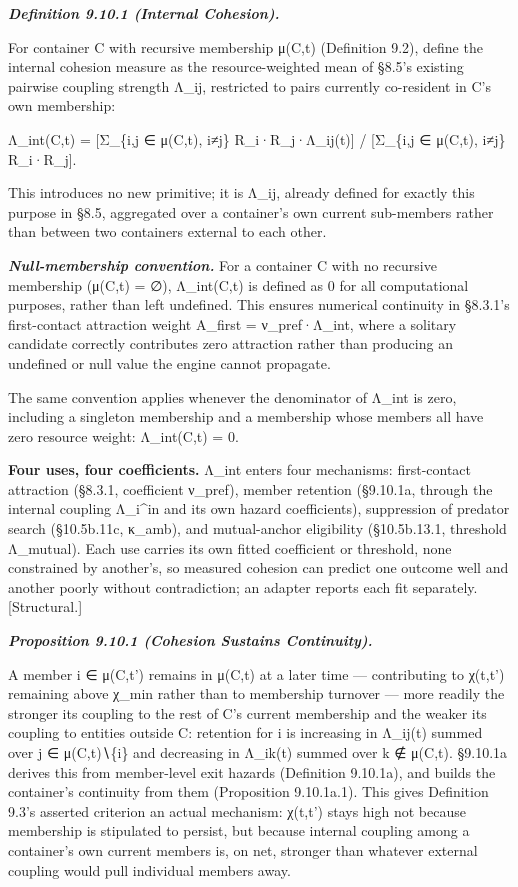 \documentclass[
]{article}
\begin{document}
\emph{\textbf{Definition 9.10.1 (Internal Cohesion).}}

For container C with recursive membership μ(C,t) (Definition 9.2),
define the internal cohesion measure as the resource-weighted mean of
§8.5's existing pairwise coupling strength Λ\_ij, restricted to pairs
currently co-resident in C's own membership:

Λ\_int(C,t) = {[}Σ\_\{i,j ∈ μ(C,t), i≠j\} R\_i·R\_j·Λ\_ij(t){]} /
{[}Σ\_\{i,j ∈ μ(C,t), i≠j\} R\_i·R\_j{]}.

This introduces no new primitive; it is Λ\_ij, already defined for
exactly this purpose in §8.5, aggregated over a container's own current
sub-members rather than between two containers external to each other.

\emph{\textbf{Null-membership convention.}} For a container C with no
recursive membership (μ(C,t) = ∅), Λ\_int(C,t) is defined as 0 for all
computational purposes, rather than left undefined. This ensures
numerical continuity in §8.3.1's first-contact attraction weight
A\_first = ν\_pref·Λ\_int, where a solitary candidate correctly
contributes zero attraction rather than producing an undefined or null
value the engine cannot propagate.

The same convention applies whenever the denominator of Λ\_int is zero,
including a singleton membership and a membership whose members all have
zero resource weight: Λ\_int(C,t) = 0.

\textbf{Four uses, four coefficients.} Λ\_int enters four mechanisms:
first-contact attraction (§8.3.1, coefficient ν\_pref), member retention
(§9.10.1a, through the internal coupling Λ\_i\^{}in and its own hazard
coefficients), suppression of predator search (§10.5b.11c, κ\_amb), and
mutual-anchor eligibility (§10.5b.13.1, threshold Λ\_mutual). Each use
carries its own fitted coefficient or threshold, none constrained by
another's, so measured cohesion can predict one outcome well and another
poorly without contradiction; an adapter reports each fit separately.
{[}Structural.{]}

\emph{\textbf{Proposition 9.10.1 (Cohesion Sustains Continuity).}}

A member i ∈ μ(C,t') remains in μ(C,t) at a later time --- contributing
to χ(t,t') remaining above χ\_min rather than to membership turnover ---
more readily the stronger its coupling to the rest of C's current
membership and the weaker its coupling to entities outside C: retention
for i is increasing in Λ\_ij(t) summed over j ∈ μ(C,t)∖\{i\} and
decreasing in Λ\_ik(t) summed over k ∉ μ(C,t). §9.10.1a derives this
from member-level exit hazards (Definition 9.10.1a), and builds the
container's continuity from them (Proposition 9.10.1a.1). This gives
Definition 9.3's asserted criterion an actual mechanism: χ(t,t') stays
high not because membership is stipulated to persist, but because
internal coupling among a container's own current members is, on net,
stronger than whatever external coupling would pull individual members
away.
\end{document}
